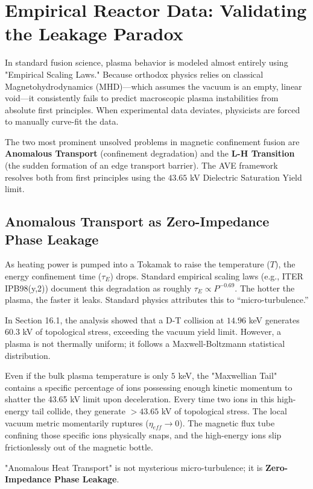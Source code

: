 \section{Empirical Reactor Data: Validating the Leakage Paradox}

In standard fusion science, plasma behavior is modeled almost entirely using "Empirical Scaling Laws." Because orthodox physics relies on classical Magnetohydrodynamics (MHD)---which assumes the vacuum is an empty, linear void---it consistently fails to predict macroscopic plasma instabilities from absolute first principles. When experimental data deviates, physicists are forced to manually curve-fit the data. 

The two most prominent unsolved problems in magnetic confinement fusion are \textbf{Anomalous Transport} (confinement degradation) and the \textbf{L-H Transition} (the sudden formation of an edge transport barrier). The AVE framework resolves both from first principles using the $43.65$ kV Dielectric Saturation Yield limit.

\subsection{Anomalous Transport as Zero-Impedance Phase Leakage}
As heating power is pumped into a Tokamak to raise the temperature ($T$), the energy confinement time ($\tau_E$) drops. Standard empirical scaling laws (e.g., ITER IPB98(y,2)) document this degradation as roughly $\tau_E \propto P^{-0.69}$. The hotter the plasma, the faster it leaks. Standard physics attributes this to ``micro-turbulence.''

In Section 16.1, the analysis showed that a D-T collision at $14.96$ keV generates $60.3$ kV of topological stress, exceeding the vacuum yield limit. However, a plasma is not thermally uniform; it follows a Maxwell-Boltzmann statistical distribution. 

Even if the bulk plasma temperature is only $5$ keV, the "Maxwellian Tail" contains a specific percentage of ions possessing enough kinetic momentum to shatter the 43.65 kV limit upon deceleration. Every time two ions in this high-energy tail collide, they generate $>43.65$ kV of topological stress. The local vacuum metric momentarily ruptures ($\eta_{eff} \to 0$). The magnetic flux tube confining those specific ions physically snaps, and the high-energy ions slip frictionlessly out of the magnetic bottle.

"Anomalous Heat Transport" is not mysterious micro-turbulence; it is \textbf{Zero-Impedance Phase Leakage}. 

